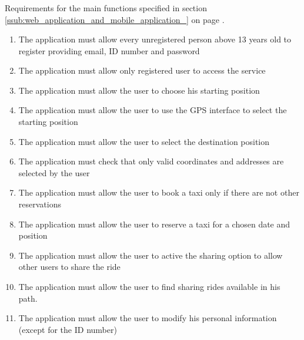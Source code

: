 \subsubsection{}
Requirements for the main functions specified in section \ref{ssub:web_application_and_mobile_application_} on page \pageref{ssub:web_application_and_mobile_application_}.
\begin{enumerate}[resume*]
	\item The application must allow every unregistered person above 13 years old to register providing email, ID number and password
	\item The application must allow only registered user to access the service
	\item The application must allow the user to choose his starting position
	\item The application must allow the user to use the GPS interface to select the starting position
	\item The application must allow the user to select the destination position
	\item The application must check that only valid coordinates and addresses  are selected by the user
	\item The application must allow the user to book a taxi only if there are not other reservations
	\item The application must allow the user to reserve a taxi for a chosen  date and position
	\item The application must allow the user to active the sharing option to allow other users to share the ride
	\item The application must allow the user to find sharing rides available in his path. 
	\item The application must allow the user to modify his personal information (except for the ID number)
\end{enumerate}

